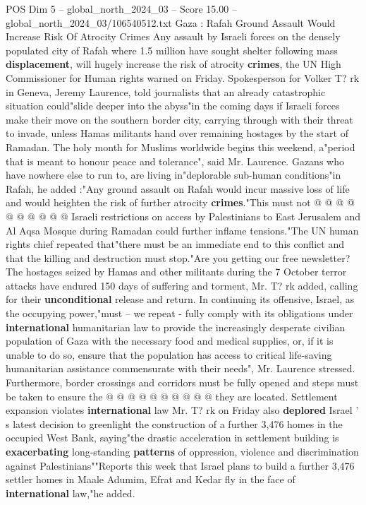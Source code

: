 \begin{textsample}{POS Dim 5 – global\_north\_2024\_03 – Score 15.00 – global\_north\_2024\_03/106540512.txt}  \label{ex:f5_pos_367}
Gaza : Rafah Ground Assault Would Increase Risk Of Atrocity Crimes Any assault by Israeli forces on the densely populated city of Rafah where 1.5 million have sought shelter following mass \textbf{displacement}, will hugely increase the risk of atrocity \textbf{crimes}, the UN High Commissioner for Human rights warned on Friday.
Spokesperson for Volker T? rk in Geneva, Jeremy Laurence, told journalists that an already catastrophic situation could"slide deeper into the abyss"in the coming days if Israeli forces make their move on the southern border city, carrying through with their threat to invade, unless Hamas militants hand over remaining hostages by the start of Ramadan.
The holy month for Muslims worldwide begins this weekend, a"period that is meant to honour peace and tolerance", said Mr.
Laurence.
Gazans who have nowhere else to run to, are living in"deplorable sub-human conditions"in Rafah, he added :"Any ground assault on Rafah would incur massive loss of life and would heighten the risk of further atrocity \textbf{crimes}."This must not @ @ @ @ @ @ @ @ @ @ Israeli restrictions on access by Palestinians to East Jerusalem and Al Aqsa Mosque during Ramadan could further inflame tensions."The UN human rights chief repeated that"there must be an immediate end to this conflict and that the killing and destruction must stop."Are you getting our free newsletter?
The hostages seized by Hamas and other militants during the 7 October terror attacks have endured 150 days of suffering and torment, Mr.
T? rk added, calling for their \textbf{unconditional} release and return.
In continuing its offensive, Israel, as the occupying power,"must -- we repeat - fully comply with its obligations under \textbf{international} humanitarian law to provide the increasingly desperate civilian population of Gaza with the necessary food and medical supplies, or, if it is unable to do so, ensure that the population has access to critical life-saving humanitarian assistance commensurate with their needs", Mr.
Laurence stressed.
Furthermore, border crossings and corridors must be fully opened and steps must be taken to ensure the @ @ @ @ @ @ @ @ @ @ they are located.
Settlement expansion violates \textbf{international} law Mr.
T? rk on Friday also \textbf{deplored} Israel ' s latest decision to greenlight the construction of a further 3,476 homes in the occupied West Bank, saying"the drastic acceleration in settlement building is \textbf{exacerbating} long-standing \textbf{patterns} of oppression, violence and discrimination against Palestinians""Reports this week that Israel plans to build a further 3,476 settler homes in Maale Adumim, Efrat and Kedar fly in the face of \textbf{international} law,"he added.

\end{textsample}
